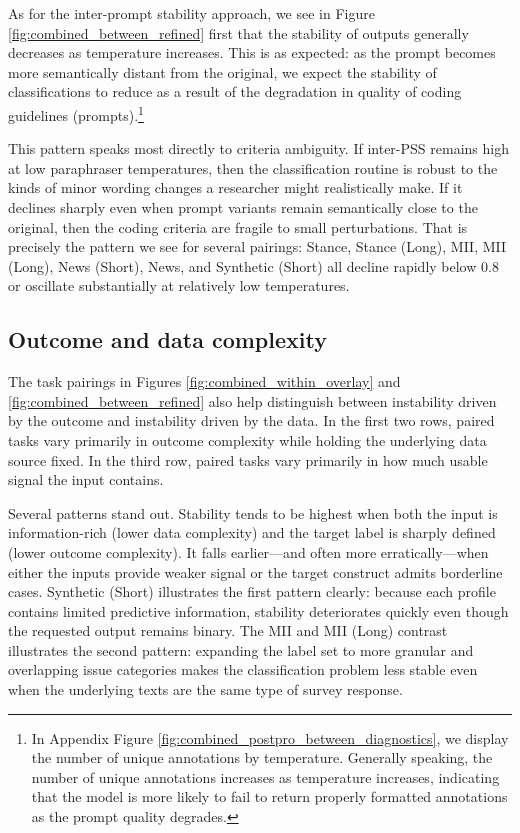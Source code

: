 \documentclass{article}
\begin{document}
As for the inter-prompt stability approach, we see in Figure \ref{fig:combined_between_refined} first that the stability of outputs generally decreases as temperature increases. This is as expected: as the prompt becomes more semantically distant from the original, we expect the stability of classifications to reduce as a result of the degradation in quality of coding guidelines (prompts).\footnote{In Appendix Figure \ref{fig:combined_postpro_between_diagnostics}, we display the number of unique annotations by temperature. Generally speaking, the number of unique annotations increases as temperature increases, indicating that the model is more likely to fail to return properly formatted annotations as the prompt quality degrades. }

This pattern speaks most directly to criteria ambiguity. If inter-PSS remains high at low paraphraser temperatures, then the classification routine is robust to the kinds of minor wording changes a researcher might realistically make. If it declines sharply even when prompt variants remain semantically close to the original, then the coding criteria are fragile to small perturbations. That is precisely the pattern we see for several pairings: Stance, Stance (Long), MII, MII (Long), News (Short), News, and Synthetic (Short) all decline rapidly below 0.8 or oscillate substantially at relatively low temperatures.

\subsection{Outcome and data complexity}

The task pairings in Figures \ref{fig:combined_within_overlay} and \ref{fig:combined_between_refined} also help distinguish between instability driven by the outcome and instability driven by the data. In the first two rows, paired tasks vary primarily in outcome complexity while holding the underlying data source fixed. In the third row, paired tasks vary primarily in how much usable signal the input contains.

Several patterns stand out. Stability tends to be highest when both the input is information-rich (lower data complexity) and the target label is sharply defined (lower outcome complexity). It falls earlier---and often more erratically---when either the inputs provide weaker signal or the target construct admits borderline cases. Synthetic (Short) illustrates the first pattern clearly: because each profile contains limited predictive information, stability deteriorates quickly even though the requested output remains binary. The MII and MII (Long) contrast illustrates the second pattern: expanding the label set to more granular and overlapping issue categories makes the classification problem less stable even when the underlying texts are the same type of survey response.
\end{document}
